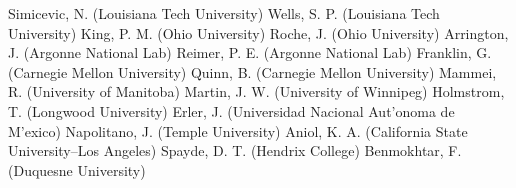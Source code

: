 Simicevic, N. (Louisiana Tech University)
Wells, S. P. (Louisiana Tech University)
King, P. M. (Ohio University)
Roche, J. (Ohio University)
Arrington, J. (Argonne National Lab)
Reimer, P. E. (Argonne National Lab)
Franklin, G. (Carnegie Mellon University)
Quinn, B. (Carnegie Mellon University)
Mammei, R. (University of Manitoba)
Martin, J. W. (University of Winnipeg)
Holmstrom, T. (Longwood University)
Erler, J. (Universidad Nacional Aut'onoma de M'exico)
Napolitano, J. (Temple University)
Aniol, K. A. (California State University--Los Angeles)
Spayde, D. T. (Hendrix College)
Benmokhtar, F. (Duquesne University)

